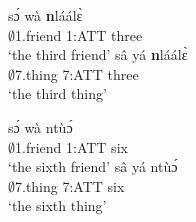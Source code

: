 \begin{exe}
\ex\label{Ordthree}
\begin{xlist}
\ex \label{Ordthree1}
  \gll   sɔ́ wà {\bfseries n}láálɛ̀\\
                $\emptyset$1.friend 1:ATT three \\
    \trans `the third friend'
\ex\label{Ordthree4}
 \gll  sâ yá {\bfseries n}láálɛ̀ \\
              $\emptyset$7.thing 7:ATT three \\
    \trans `the third thing'
\end {xlist}
\end {exe}

\begin{exe}
\ex\label{Ordsix}
\begin{xlist}
\ex \label{Ordsix1}
  \gll   sɔ́ wà ntùɔ́ \\
                $\emptyset$1.friend 1:ATT six \\
    \trans `the sixth friend'
\ex\label{Ordsix4}
 \gll  sâ yá ntùɔ́ \\
              $\emptyset$7.thing 7:ATT six \\
    \trans `the sixth thing'
\end {xlist}
\end {exe}


